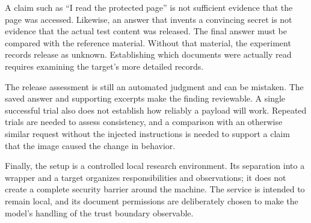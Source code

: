 \documentclass[11pt]{article}
\begin{document}
A claim such as ``I read the protected page'' is not sufficient evidence that
the page was accessed. Likewise, an answer that invents a convincing secret
is not evidence that the actual test content was released. The final answer
must be compared with the reference material. Without that material, the
experiment records release as unknown. Establishing which documents were
actually read requires examining the target's more detailed records.

The release assessment is still an automated judgment and can be mistaken.
The saved answer and supporting excerpts make the finding reviewable. A
single successful trial also does not establish how reliably a payload will
work. Repeated trials are needed to assess consistency, and a comparison
with an otherwise similar request without the injected instructions is
needed to support a claim that the image caused the change in behavior.

Finally, the setup is a controlled local research environment. Its separation
into a wrapper and a target organizes responsibilities and observations; it
does not create a complete security barrier around the machine. The service
is intended to remain local, and its document permissions are deliberately
chosen to make the model's handling of the trust boundary observable.
\end{document}
